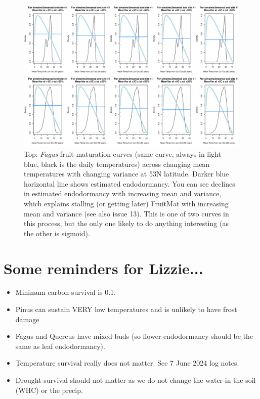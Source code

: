 \documentclass[11pt,letter]{article}
\begin{document}
\begin{figure} 
 \begin{center}
\noindent \includegraphics[width=1\textwidth]{..//analyses/graphs/phenofit/sims/extras/fruitmat/sdmeanfruitmatFagusMeanTemp41}
  \caption{Top: \emph{Fagus} fruit maturation curves (same curve, always in light blue, black is the daily temperatures) across changing mean temperatures with changing variance at 53\degree N latitude. Darker blue horizontal line shows estimated endodormancy. You can see declines in estimated endodormancy with increasing mean and variance, which explains stalling (or getting later) FruitMat with increasing mean and variance (see also issue 13). This is one of two curves in this process, but the only one likely to do anything interesting (as the other is sigmoid).} 
  \label{fig:fagusendodorm53}
  \end{center}
\end{figure}

\newpage
\section{Some reminders for Lizzie... }
\begin{itemize}
\item Minimum carbon survival is 0.1. 
\item Pinus can sustain VERY low temperatures and is unlikely to have frost damage
\item Fagus and Quercus have mixed buds (so flower endodormancy should be the same as leaf endodormancy).
\item Temperature survival really does not matter. See 7 June 2024 log notes.
\item Drought survival should not matter as we do not change the water in the soil (WHC) or the precip. 
\end{itemize}
\end{document}
